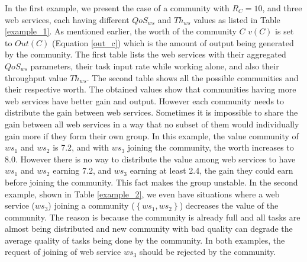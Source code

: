 \documentclass[10pt,journal,cspaper,compsoc]{IEEEtran}
\begin{document}
In the first example,  we present the case of a community with
$R_C =10 $, and three web services, each having different
$QoS_{ws}$ and $Th_{ws}$ values as listed in Table
\ref{example_1}. As mentioned earlier, the worth of the community
$C$ $v(C)$ is set to $Out(C)$ (Equation \ref{out_c}) which is the
amount of output being generated by the community. The first table
lists the web services with their aggregated $QoS_{ws}$
parameters, their task input rate while working alone, and also
their throughput value $Th_{ws}$. The second table shows all the
possible communities and their respective worth. The obtained
values show that communities having more web services have better
gain and output. However each community needs to distribute the
gain between web services. Sometimes it is impossible to share the
gain between all web services in a way that no subset of them
would individually gain more if they form their own group. In this
example, the value community of ${ws_1}$ and ${ws_2}$ is 7.2, and
with ${ws_3}$ joining the community, the worth increases to 8.0.
However there is no way to distribute the value among web services
to have ${ws_1}$ and ${ws_2}$  earning 7.2, and ${ws_3}$ earning
at least 2.4, the gain they could earn before joining the
community. This fact makes the group unstable. In the second
example, shown in Table \ref{example_2}, we even have situations
where a web service (${ws_3}$) joining a community
($\left\{ws_1,ws_2\right\}$) decreases the value of the community.
The reason is because the community is already full and all tasks
are almost being distributed and new community with bad quality
can degrade the average quality of tasks being done by the
community. In both examples, the request of joining of web service
${ws_3}$ should be rejected by the community.
\end{document}

